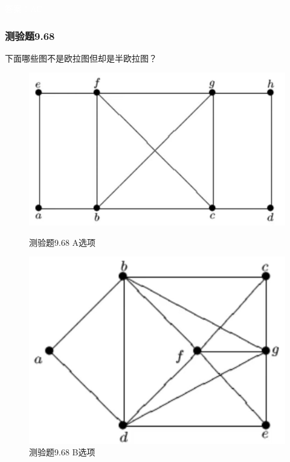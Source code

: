 \documentclass[UTF8, heading=true]{ctexart}
\begin{document}
\textcolor{white}{答案：AC}

\subsubsection{测验题9.68}

下面哪些图不是欧拉图但却是半欧拉图？

\begin{figure}[H]
  \centering
  \begin{minipage}[t]{0.35\textwidth}
      \centering
      \includegraphics[width=1\textwidth]{9.67_1.jpg} %
      \vspace{-0.3cm}
      \caption{测验题9.68 A选项}
  \end{minipage}
  \hspace{0.1\textwidth} %
  \begin{minipage}[t]{0.35\textwidth}
      \centering
      \includegraphics[width=1\textwidth]{9.67_2.jpg} %
      \vspace{-0.3cm}
      \caption{测验题9.68 B选项}
\end{minipage}
\end{figure}
\end{document}
